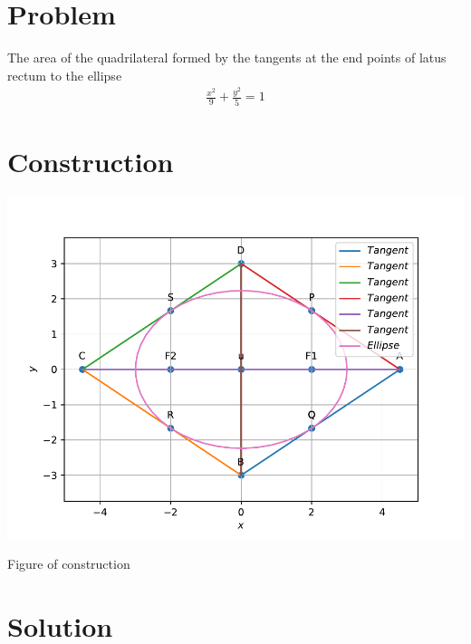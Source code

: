 \documentclass[10pt, a4paper]{article}
\title{\mytitle}
\author{\myauthor\hspace{1em}\\\contact\\FWC22034\hspace{6.5em}IITH\hspace{0.5em}\mymodule\hspace{6em}Assignment}
\begin{document}
	\maketitle
	\tableofcontents
   \section{Problem}
 The area of the quadrilateral formed by the tangents at the end points of latus rectum to the ellipse \begin{align}
\frac{x^2}{9}+\frac{y^2}{5}=1
  \end{align}
\section{Construction}
  \includegraphics[scale=0.47]{matrix.pdf}
  	\begin{center}
  Figure of construction
  	\end{center}
  \section{Solution}
\end{document}
